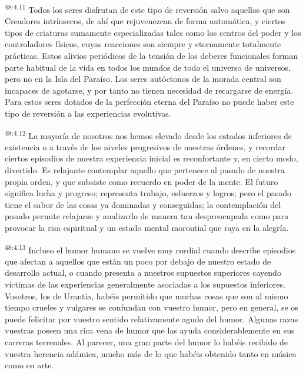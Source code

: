 \par
\textsuperscript{48:4.11} Todos los seres disfrutan de este tipo de reversión salvo aquellos que son Creadores intrínsecos, de ahí que rejuvenezcan de forma automática, y ciertos tipos de criaturas sumamente especializadas tales como los centros del poder y los controladores físicos, cuyas reacciones son siempre y eternamente totalmente prácticas. Estos alivios periódicos de la tensión de los deberes funcionales forman parte habitual de la vida en todos los mundos de todo el universo de universos, pero no en la Isla del Paraíso. Los seres autóctonos de la morada central son incapaces de agotarse, y por tanto no tienen necesidad de recargarse de energía. Para estos seres dotados de la perfección eterna del Paraíso no puede haber este tipo de reversión a las experiencias evolutivas.

\par
\textsuperscript{48:4.12} La mayoría de nosotros nos hemos elevado desde los estados inferiores de existencia o a través de los niveles progresivos de nuestras órdenes, y recordar ciertos episodios de nuestra experiencia inicial es reconfortante y, en cierto modo, divertido. Es relajante contemplar aquello que pertenece al pasado de nuestra propia orden, y que subsiste como recuerdo en poder de la mente. El futuro significa lucha y progreso; representa trabajo, esfuerzos y logros; pero el pasado tiene el sabor de las cosas ya dominadas y conseguidas; la contemplación del pasado permite relajarse y analizarlo de manera tan despreocupada como para provocar la risa espiritual y un estado mental morontial que raya en la alegría.

\par
\textsuperscript{48:4.13} Incluso el humor humano se vuelve muy cordial cuando describe episodios que afectan a aquellos que están un poco por debajo de nuestro estado de desarrollo actual, o cuando presenta a nuestros supuestos superiores cayendo víctimas de las experiencias generalmente asociadas a los supuestos inferiores. Vosotros, los de Urantia, habéis permitido que muchas cosas que son al mismo tiempo crueles y vulgares se confundan con vuestro humor, pero en general, se os puede felicitar por vuestro sentido relativamente agudo del humor. Algunas razas vuestras poseen una rica vena de humor que las ayuda considerablemente en sus carreras terrenales. Al parecer, una gran parte del humor lo habéis recibido de vuestra herencia adámica, mucho más de lo que habéis obtenido tanto en música como en arte.

